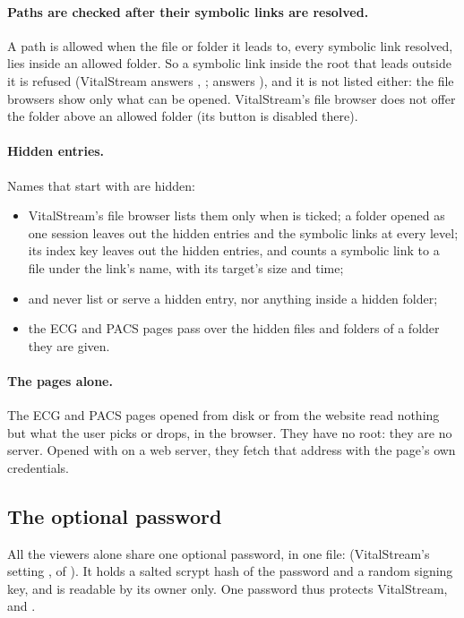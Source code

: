 \paragraph{Paths are checked after their symbolic links are resolved.} A path is allowed when the
file or folder it leads to, every symbolic link resolved, lies inside an allowed folder. So a
symbolic link inside the root that leads outside it is refused (VitalStream answers
, ;  answers ), and
it is not listed either: the file browsers show only what can be opened. VitalStream's file
browser does not offer the folder above an allowed folder (its \ui{$\uparrow$} button is
disabled there).

\paragraph{Hidden entries.} Names that start with  are hidden:
\begin{itemize}
\item VitalStream's file browser lists them only when  is ticked; a folder opened as
  one session leaves out the hidden entries and the symbolic links at every level; its index key
  leaves out the hidden entries, and counts a symbolic link to a file under the link's name, with
  its target's size and time;
\item {} and  never list or serve a hidden entry, nor
  anything inside a hidden folder;
\item the ECG and PACS pages pass over the hidden files and folders of a folder they are given.
\end{itemize}

\paragraph{The pages alone.} The ECG and PACS pages opened from disk or from the website read
nothing but what the user picks or drops, in the browser. They have no root: they are no server.
Opened with  on a web server, they fetch that address with the page's own
credentials.

\subsection{The optional password}
\label{sec:viewers-alone-password}

All the viewers alone share one optional password, in one file:
 (VitalStream's setting ,
 of ). It holds a salted scrypt hash of the password and a
random signing key, and is readable by its owner only. One password thus protects VitalStream,
 and .

